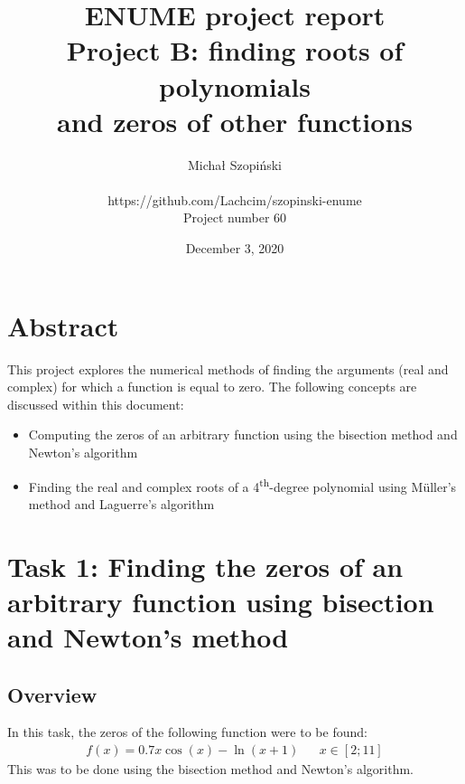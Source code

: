 \documentclass{article}
\begin{document}
	\title{ENUME project report\\Project B: finding roots of polynomials \\
	and zeros of other functions}
	\author{Michał Szopiński\\\\
	https://github.com/Lachcim/szopinski-enume\\
	Project number 60}
	\date{December 3, 2020}
	\maketitle
	
	
	\setcounter{section}{-1}
	\section{Abstract}
	
	This project explores the numerical methods of finding the arguments (real
	and complex) for which a function is equal to zero. The following concepts
	are discussed within this document:
	
	\begin{itemize}
		\item Computing the zeros of an arbitrary function using the bisection
		method and Newton's algorithm
		\item Finding the real and complex roots of a
		4\textsuperscript{th}-degree polynomial using M{\"u}ller's method and
		Laguerre's algorithm
	\end{itemize}
	
	\newpage
	
	\section{Task 1: Finding the zeros of an arbitrary function using bisection
	and Newton's method}
	
	\subsection{Overview}
	
	In this task, the zeros of the following function were to be found:
	\begin{align*}
		f(x) = 0.7 x \cos(x) - \ln(x + 1) && x \in [2; 11]
	\end{align*}
	This was to be done using the bisection method and Newton's algorithm.
	
\end{document}
